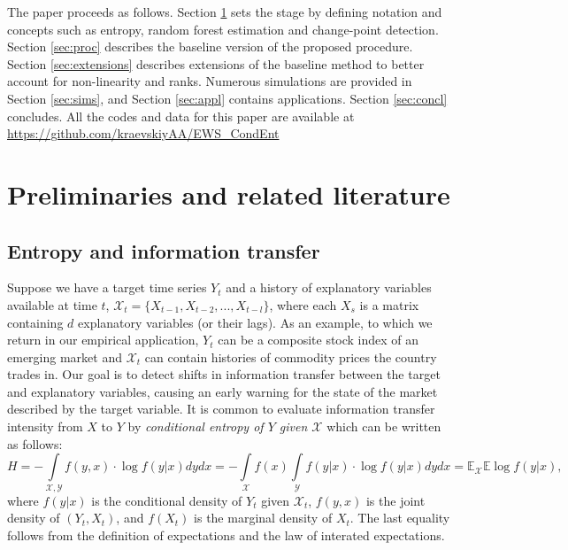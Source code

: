 The paper proceeds as follows. Section \ref{sec:prelims} sets the stage by defining notation and concepts such as entropy, random forest estimation and change-point detection. Section 
\ref{sec:proc} describes the baseline version of the proposed procedure. Section \ref{sec:extensions} describes extensions of the baseline method to better account for non-linearity and ranks. Numerous simulations are provided in Section \ref{sec:sims}, and Section \ref{sec:appl} contains applications. Section \ref{sec:concl} concludes. All the codes and data for this paper are available at \url{https://github.com/kraevskiyAA/EWS_CondEnt}

\section{Preliminaries and related literature}\label{sec:prelims}



\subsection{Entropy and information transfer}

Suppose we have a target time series $Y_t$ and a history of explanatory variables available at time $t$, $\mathcal{X}_t = \{{X}_{t-1}, {X}_{t-2}, ..., {X}_{t-l}\}$, where each ${X}_{s}$ is a matrix containing $d$ explanatory variables (or their lags). As an example, to which we return in our empirical application, $Y_t$ can be a composite stock index of an emerging market and $\mathcal{X}_t$ can contain histories of commodity prices the country trades in. Our goal is to detect shifts in information transfer between the target and explanatory variables, causing an early warning for the state of the market described by the target variable.
It is common to evaluate information transfer intensity from $X$ to $Y$ by \emph{conditional entropy of $Y$ given $\mathcal{X}$} \cite[see, e.g.,][]{ORLITSKY2003751} which can be written as follows:
\begin{equation}\label{eq:H(x|Y)}
    H = -\int\limits_{\mathcal{X},\mathcal{Y}} f(y, x) \cdot \log f(y|x) dydx = -\int\limits_{\mathcal{X}} f(x)\int\limits_{\mathcal{Y}} f(y| x) \cdot \log f(y|x) dydx = \mathbb{E}_{\mathcal{X}} \mathbb{E} \log f(y|x),
\end{equation}
where $f(y| x)$ is the conditional density of $Y_t$ given $\mathcal{X}_t$,  $f(y,  x)$ is the joint density of $(Y_t, X_t)$, and $f(X_t)$ is the marginal density of $X_t$. The last equality follows from the definition of expectations and the law of interated expectations.

